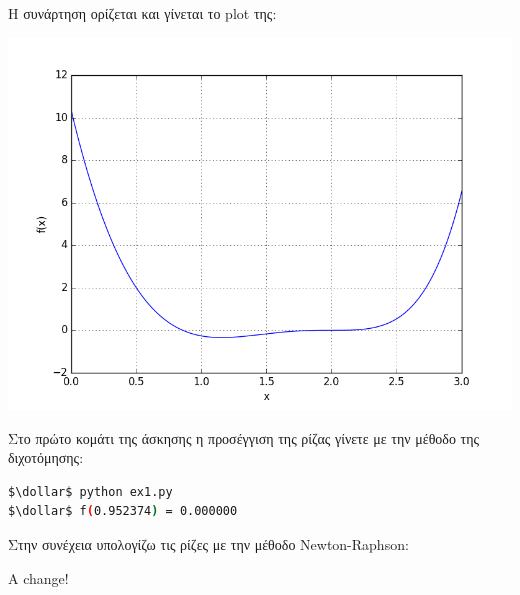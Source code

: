 \documentclass[12pt]{article}
\newcommand{\dollar}{\mbox{\textdollar}}
\begin{document}
Η συνάρτηση ορίζεται και γίνεται το plot της:


\begin{center}
\includegraphics[scale = 0.8]{plot.png}
\end{center}

Στο πρώτο κομάτι της άσκησης η προσέγγιση της ρίζας γίνετε με την μέθοδο της διχοτόμησης:



\begin{lstlisting}[language=bash, numbers=none, mathescape=true]
$\dollar$ python ex1.py
$\dollar$ f(0.952374) = 0.000000
\end{lstlisting}

Στην συνέχεια υπολογίζω τις ρίζες με την μέθοδο Newton-Raphson:

A change!
\end{document}
